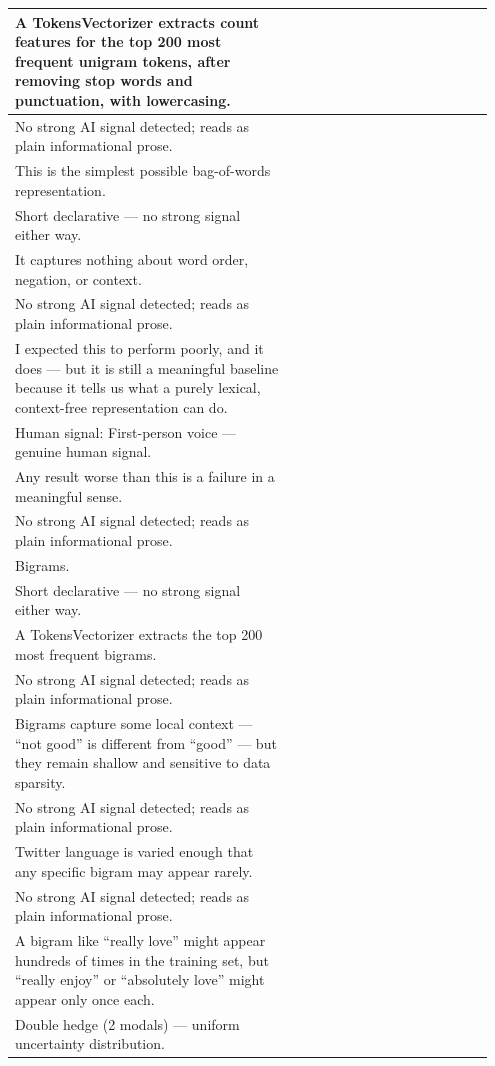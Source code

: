 \documentclass[11pt]{article}
\begin{document}
\begin{longtable}{|p{0.55\linewidth}|p{0.40\linewidth}|}
A TokensVectorizer extracts count features for the top 200 most frequent unigram tokens, after removing stop words and punctuation, with lowercasing. & \\[2pt]
\hline
No strong AI signal detected; reads as plain informational prose. & \\
\hline
This is the simplest possible bag-of-words representation. & \\[2pt]
\hline
Short declarative --- no strong signal either way. & \\
\hline
It captures nothing about word order, negation, or context. & \\[2pt]
\hline
No strong AI signal detected; reads as plain informational prose. & \\
\hline
I expected this to perform poorly, and it does --- but it is still a meaningful baseline because it tells us what a purely lexical, context-free representation can do. & \\[2pt]
\hline
Human signal: First-person voice --- genuine human signal. & \\
\hline
Any result worse than this is a failure in a meaningful sense. & \\[2pt]
\hline
No strong AI signal detected; reads as plain informational prose. & \\
\hline
Bigrams. & \\[2pt]
\hline
Short declarative --- no strong signal either way. & \\
\hline
A TokensVectorizer extracts the top 200 most frequent bigrams. & \\[2pt]
\hline
No strong AI signal detected; reads as plain informational prose. & \\
\hline
Bigrams capture some local context --- ``not good'' is different from ``good'' --- but they remain shallow and sensitive to data sparsity. & \\[2pt]
\hline
No strong AI signal detected; reads as plain informational prose. & \\
\hline
Twitter language is varied enough that any specific bigram may appear rarely. & \\[2pt]
\hline
No strong AI signal detected; reads as plain informational prose. & \\
\hline
A bigram like ``really love'' might appear hundreds of times in the training set, but ``really enjoy'' or ``absolutely love'' might appear only once each. & \\[2pt]
\hline
Double hedge (2 modals) --- uniform uncertainty distribution. & \\

\end{longtable}
\end{document}
